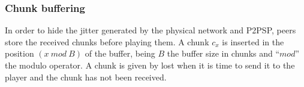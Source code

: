 \subsubsection{Chunk buffering}
In order to hide the jitter generated by the physical network and
P2PSP, peers store the received chunks before playing them. A chunk
$c_x$ is inserted in the position $(x~\mathit{mod}~B)$ of the buffer,
being $B$ the buffer size in chunks and ``$\mathit{mod}$'' the modulo
operator. A chunk is given by lost when it is time to send it to the
player and the chunk has not been received.

\begin{comment}
\subsubsection{Shortest path computation}
\label{dbs:chunk_routing}
\begin{figure}
  \texttt{[image: shortest\_path\_computation]}
  \caption{Shortest path computation.\label{fig:shortest_path_computation}}
\end{figure}
The shortest path distances among peers are determined by a variation
of the Bellman-Ford Algorithm~\cite{Bertsekas1987data} (see
Fig.~\ref{fig:shortest_path_computation}), where the cost of the
``links'' between neighbor peers is $1$. Neighbor peers interchange
two vectors $D[\cdot]$ (distance-to-peer) and $G[\cdot]$
(gateway-to-peer) and compute the shortest distances and the (peer)
gateways to (reach) the rest of peers of its team ${\cal T}_j$.

This algorithm is free of routing loops and is not suceptible of the
well known count-to-infinity problem, and therefore always converges
for static teams. These problems do not appear because the routes are 

Each peer ${\cal P}_k$ sends
its vector of distances $D[\forall {\cal P}_i\in T^*({\cal P}_k)]$ and
gateways $G[\forall {\cal P}_i\in T^*({\cal P}_k)]$ to each
neighbor. When this information is received, peers check if shorter
routes can be found to the rest of peers of the reachable team, and if
so, send these vectors again.

The Bellman-Ford algorithm is susceptible of routing loops and the
count-to-infinite problem.




\end{comment}

